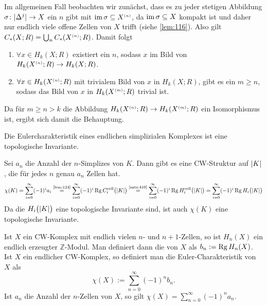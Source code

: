 \begin{beweis}
\begin{enumerate}[a)]
		Im allgemeinen Fall beobachten wir zunächst, dass es zu jeder stetigen Abbildung $\sigma\colon\abs{\Delta^j}\to X$ ein $n$ gibt mit 
		$\im \sigma \subseteq X^\ssbrace{n}$, da $\im \sigma \subseteq X$ kompakt ist und daher nur endlich viele offene Zellen von $X$ trifft (siehe \autoref{lem:116}).
		Also gilt
		\(
			C_*(X;R) = \bigcup_n C_*(X^\ssbrace{n};R)
		\).
		Damit folgt \begin{enumerate}[(1)]
			\item $\forall x \in H_k(X;R) $ existiert ein $n$, sodass $x$ im Bild von $ H_k(X^\ssbrace{n};R) \to H_k(X;R)$.
			\item $\forall x\in H_k(X^\ssbrace{n};R)$ mit trivialem Bild von $x$ in $H_k(X;R)$, gibt es ein $m \ge n$, sodass das Bild von $x$ in $H_k(X^\ssbrace{m};R)$
			trivial ist.
		\end{enumerate}
		Da für $m \ge n >k$ die Abbildung $H_k(X^\ssbrace{n};R) \to H_k(X^\ssbrace{m};R)$ ein Isomorphismus ist, ergibt sich damit die Behauptung. \qedhere 
	\end{enumerate}
\end{beweis}

\begin{korollar}[{name=[Die Eulercharakteristik ist eine topologische Invariante]},label=kor:129]
	Die Eulercharakteristik eines endlichen simplizialen Komplexes ist eine topologische Invariante.
\end{korollar}
\begin{beweis}
	Sei $a_n$ die Anzahl der $n$-Simplizes von $K$. 
	Dann gibt es eine CW-Struktur auf $\abs*{K}$, die für jedes $n$ genau $a_n$ Zellen hat.
	\[
		\chi(K) = \sum_{i=0}^{\infty} (-1)^i a_i \StackText{\ref{lem:124}}{=} \sum_{i=0}^{\infty} (-1)^i \Rg C_i^{\cell} \enbrace[\big]{\abs*{K}} 
		\StackText{\ref{satz:410}}{=}
		\sum_{i=0}^{\infty} (-1)^i \Rg H_i^{\cell} \enbrace[\big]{\abs*{K}} = \sum_{i=0}^{\infty} (-1)^i \Rg H_i \enbrace[\big]{\abs*{K} }    
	\]
	Da die $H_i \enbrace[\big]{\abs*{K}}$ eine topologische Invariante sind, ist auch $\chi(K)$ eine topologische Invariante.
\end{beweis}

\begin{bemerkung}[{name=[{n-te Bettizahl und Eulercharakteristik eines CW-Komplexes}]}]
	Ist $X$ ein CW-Komplex mit endlich vielen $n$- und $n+1$-Zellen, so ist $H_n(X)$ ein endlich erzeugter $\mathbb{Z}$-Modul. 
	Man definiert dann die  von $X$ als $b_n := \Rg H_n(X)$. 
	Ist $X$ ein endlicher CW-Komplex, so definiert man die Euler-Charakteristik von $X$ als
	\[
		\chi(X) := \sum_{n=0}^{\infty} (-1)^{n} b_n.
	\]
	Ist $a_n$ die Anzahl der $n$-Zellen von $X$, so gilt $\chi(X)=\sum_{n=0}^{\infty} (-1)^n a_n$.
\end{bemerkung}

